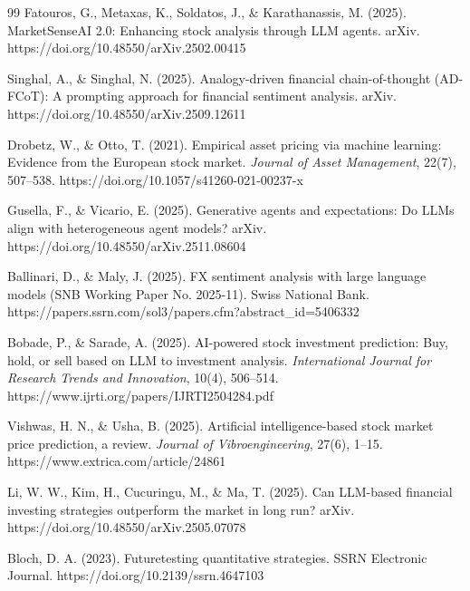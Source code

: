 \documentclass[12pt, a4paper]{report}
\begin{document}
\begin{thebibliography}{99}
Fatouros, G., Metaxas, K., Soldatos, J., \& Karathanassis, M. (2025). MarketSenseAI 2.0: Enhancing stock analysis through LLM agents. arXiv. https://doi.org/10.48550/arXiv.2502.00415

Singhal, A., \& Singhal, N. (2025). Analogy-driven financial chain-of-thought (AD-FCoT): A prompting approach for financial sentiment analysis. arXiv. https://doi.org/10.48550/arXiv.2509.12611

Drobetz, W., \& Otto, T. (2021). Empirical asset pricing via machine learning: Evidence from the European stock market. \textit{Journal of Asset Management}, 22(7), 507--538. https://doi.org/10.1057/s41260-021-00237-x

Gusella, F., \& Vicario, E. (2025). Generative agents and expectations: Do LLMs align with heterogeneous agent models? arXiv. https://doi.org/10.48550/arXiv.2511.08604

Ballinari, D., \& Maly, J. (2025). FX sentiment analysis with large language models (SNB Working Paper No. 2025-11). Swiss National Bank. https://papers.ssrn.com/sol3/papers.cfm?abstract\_id=5406332

Bobade, P., \& Sarade, A. (2025). AI-powered stock investment prediction: Buy, hold, or sell based on LLM to investment analysis. \textit{International Journal for Research Trends and Innovation}, 10(4), 506--514. https://www.ijrti.org/papers/IJRTI2504284.pdf

Vishwas, H. N., \& Usha, B. (2025). Artificial intelligence-based stock market price prediction, a review. \textit{Journal of Vibroengineering}, 27(6), 1--15. https://www.extrica.com/article/24861

Li, W. W., Kim, H., Cucuringu, M., \& Ma, T. (2025). Can LLM-based financial investing strategies outperform the market in long run? arXiv. https://doi.org/10.48550/arXiv.2505.07078

Bloch, D. A. (2023). Futuretesting quantitative strategies. SSRN Electronic Journal. https://doi.org/10.2139/ssrn.4647103


\end{thebibliography}
\end{document}
